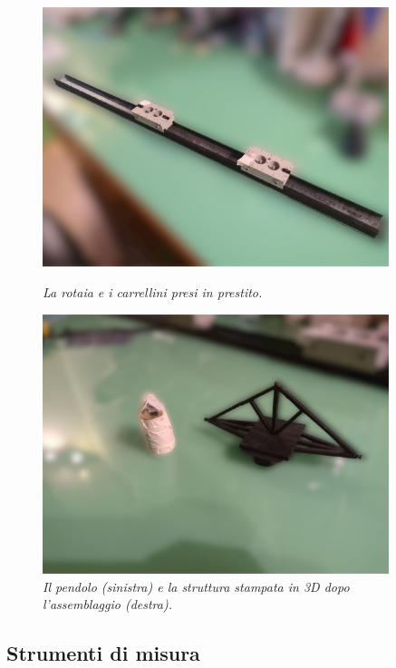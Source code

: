 \documentclass[11pt, a4paper, twoside]{article}
\begin{document}
\begin{figure}[h!]
  \centering
\begin{minipage}[t]{0.45\textwidth}
  \centering
  \includegraphics[valign=t, width=0.9\textwidth]{../../media/img/rail_processed.png}
  \caption{\textit{La rotaia e i carrellini presi in prestito.}}
  \label{photo_rail}
\end{minipage}
\begin{minipage}[t]{0.45\textwidth}
  \centering
  \includegraphics[valign=t, width=0.9\textwidth]{../../media/img/crane_rail-processed.png}
  \caption{\textit{Il pendolo (sinistra) e la struttura stampata in 3D dopo l'assemblaggio
  (destra).}}
  \label{photo_crane}
\end{minipage}
\end{figure}

\subsection{Strumenti di misura}
\end{document}
